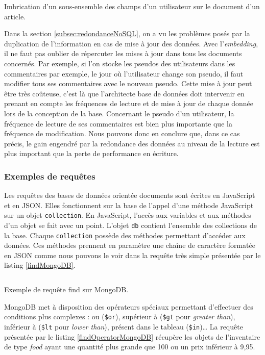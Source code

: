	\begin{listing}[H]
		\inputminted{json}{code/duplicationSousEnsemble.json}
		\caption{Imbrication d'un sous-ensemble des champs d'un utilisateur sur le document d'un article.}
		\label{listing:embeddingPartiel}
	\end{listing}

	Dans la section \ref{subsec:redondanceNoSQL}, on a vu les problèmes posés par la duplication de l'information en cas de mise à jour des données. Avec l'\textit{embedding}, il ne faut pas oublier de répercuter les mises à jour dans tous les documents concernés. Par exemple, si l'on stocke les pseudos des utilisateurs dans les commentaires par exemple, le jour où l'utilisateur change son pseudo, il faut modifier tous ses commentaires avec le nouveau pseudo. Cette mise à jour peut être très coûteuse, c'est là que l'architecte base de données doit intervenir en prenant en compte les fréquences de lecture et de mise à jour de chaque donnée lors de la conception de la base. Concernant le pseudo d'un utilisateur, la fréquence de lecture de ses commentaires est bien plus importante que la fréquence de modification. Nous pouvons donc en conclure que, dans ce cas précis, le gain engendré par la redondance des données au niveau de la lecture est plus important que la perte de performance en écriture.
						

\subsubsection{Exemples de requêtes}

	Les requêtes des bases de données orientée documents sont écrites en JavaScript et en JSON. Elles fonctionnent sur la base de l'appel d'une méthode JavaScript sur un objet \verb|collection|. En JavaScript, l'accès aux variables et aux méthodes d'un objet se fait avec un point. L'objet \verb|db| contient l'ensemble des collections de la base. Chaque \verb|collection| possède des méthodes permettant d'accéder aux données. Ces méthodes prennent en paramètre une chaîne de caractère formatée en JSON comme nous pouvons le voir dans la requête très simple présentée par le listing \ref{findMongoDB}.

	\begin{listing}[H]
		\inputminted{javascript}{code/requeteMongoFind.js}
		\caption{Exemple de requête find sur MongoDB.}
		\label{findMongoDB}
	\end{listing}

	MongoDB met à disposition des opérateurs spéciaux permettant d'effectuer des conditions plus complexes : ou (\verb|$or|), supérieur à (\verb|$gt| pour \textit{greater than}), inférieur à (\verb|$lt| pour \textit{lower than}), présent dans le tableau (\verb|$in|)\dots{} La requête présentée par le listing \ref{findOperatorMongoDB} récupère les objets de l'inventaire de type \textit{food} ayant une quantité plus grande que 100 ou un prix inférieur à 9,95.

